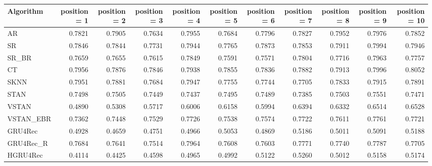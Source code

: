 \begin{tabular}{lrrrrrrrrrr}
\toprule
 Algorithm &  position = 1 &  position = 2 &  position = 3 &  position = 4 &  position = 5 &  position = 6 &  position = 7 &  position = 8 &  position = 9 &  position = 10 \\
\midrule
        AR &        0.7821 &        0.7905 &        0.7634 &        0.7955 &        0.7684 &        0.7796 &        0.7827 &        0.7952 &        0.7976 &         0.7852 \\
        SR &        0.7846 &        0.7844 &        0.7731 &        0.7944 &        0.7765 &        0.7873 &        0.7853 &        0.7911 &        0.7994 &         0.7946 \\
     SR\_BR &        0.7659 &        0.7655 &        0.7615 &        0.7849 &        0.7591 &        0.7571 &        0.7804 &        0.7716 &        0.7963 &         0.7757 \\
        CT &        0.7956 &        0.7876 &        0.7846 &        0.7938 &        0.7855 &        0.7836 &        0.7882 &        0.7913 &        0.7996 &         0.8052 \\
      SKNN &        0.7951 &        0.7881 &        0.7684 &        0.7947 &        0.7755 &        0.7744 &        0.7705 &        0.7833 &        0.7915 &         0.7891 \\
      STAN &        0.7498 &        0.7505 &        0.7449 &        0.7437 &        0.7495 &        0.7489 &        0.7385 &        0.7503 &        0.7551 &         0.7471 \\
     VSTAN &        0.4890 &        0.5308 &        0.5717 &        0.6006 &        0.6158 &        0.5994 &        0.6394 &        0.6332 &        0.6514 &         0.6528 \\
 VSTAN\_EBR &        0.7362 &        0.7448 &        0.7529 &        0.7726 &        0.7538 &        0.7574 &        0.7722 &        0.7611 &        0.7761 &         0.7721 \\
   GRU4Rec &        0.4928 &        0.4659 &        0.4751 &        0.4966 &        0.5053 &        0.4869 &        0.5186 &        0.5011 &        0.5091 &         0.5188 \\
 GRU4Rec\_R &        0.7684 &        0.7641 &        0.7514 &        0.7964 &        0.7608 &        0.7603 &        0.7771 &        0.7740 &        0.7787 &         0.7705 \\
  HGRU4Rec &        0.4114 &        0.4425 &        0.4598 &        0.4965 &        0.4992 &        0.5122 &        0.5260 &        0.5012 &        0.5158 &         0.5174 \\
\bottomrule
\end{tabular}
